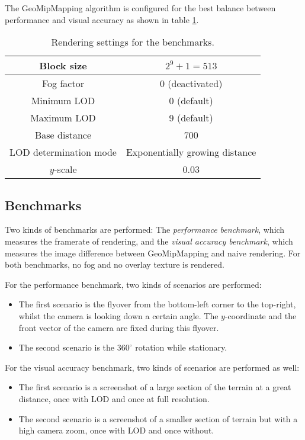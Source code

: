 The GeoMipMapping algorithm is configured for the best balance between 
performance and visual accuracy as shown in table \ref{tbl:bench-settings}.

\begin{table}[H]
  \begin{center}
    \begin{tabular}{ c|c }
      Block size & $2^9 + 1 = 513$\\
      \hline
      Fog factor & 0 (deactivated)\\
      \hline
      Minimum LOD & 0 (default)\\
      \hline
      Maximum LOD & 9 (default)\\
      \hline 
      Base distance & 700\\
      \hline
      LOD determination mode & Exponentially growing distance\\
      \hline
      $y$-scale & 0.03
    \end{tabular}
  \end{center}
  \caption{Rendering settings for the benchmarks.}\label{tbl:bench-settings}
  \end{table}

\subsection{Benchmarks}
Two kinds of benchmarks are performed: The \textit{performance benchmark},
which measures the framerate of rendering, and the \textit{visual accuracy benchmark}, 
which measures the image difference between GeoMipMapping and naive rendering.
For both benchmarks, no fog and no overlay texture is rendered.

For the performance benchmark, two kinds of scenarios are performed:
\begin{itemize}
  \item The first scenario is the flyover from the bottom-left corner to the top-right, whilst the camera is looking down a certain angle.
        The $y$-coordinate and the front vector of the camera are fixed during this flyover.
  \item The second scenario is the $360^{\circ}$ rotation while stationary. 
\end{itemize}

For the visual accuracy benchmark, two kinds of scenarios are performed as well:
\begin{itemize}
  \item The first scenario is a screenshot of a large section of the terrain at a great distance, once with LOD and once at full resolution.
  \item The second scenario is a screenshot of a smaller section of terrain but with a high camera zoom, once with LOD and once without.
\end{itemize}

